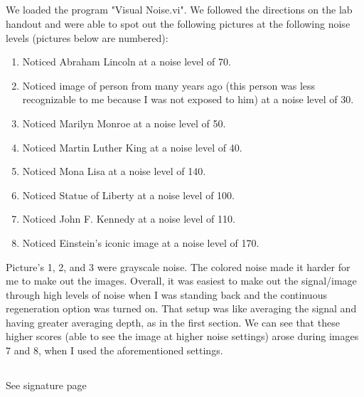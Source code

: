 \documentclass{article}
\begin{document}
\subsection{}
    We loaded the program "Visual Noise.vi". We followed the directions on the lab handout and were able to spot out the following pictures at the following noise levels (pictures below are numbered):
    \begin{enumerate}
        \item Noticed Abraham Lincoln at a noise level of 70.
        \item Noticed image of person from many years ago (this person was less recognizable to me because I was not exposed to him) at a noise level of 30.
        \item Noticed Marilyn Monroe at a noise level of 50.
        \item Noticed Martin Luther King at a noise level of 40.
        \item Noticed Mona Lisa at a noise level of 140.
        \item Noticed Statue of Liberty at a noise level of 100.
        \item Noticed John F. Kennedy at a noise level of 110.
        \item Noticed Einstein's iconic image at a noise level of 170.
    \end{enumerate}
    Picture's 1, 2, and 3 were grayscale noise. The colored noise made it harder for me to make out the images. Overall, it was easiest to make out the signal/image through high levels of noise when I was standing back and the continuous regeneration option was turned on. That setup was like averaging the signal and having greater averaging depth, as in the first section. We can see that these higher scores  (able to see the image at higher noise settings) arose during images 7 and 8, when I used the aforementioned settings.
    
\subsection{}
    See signature page
    
\end{document}
